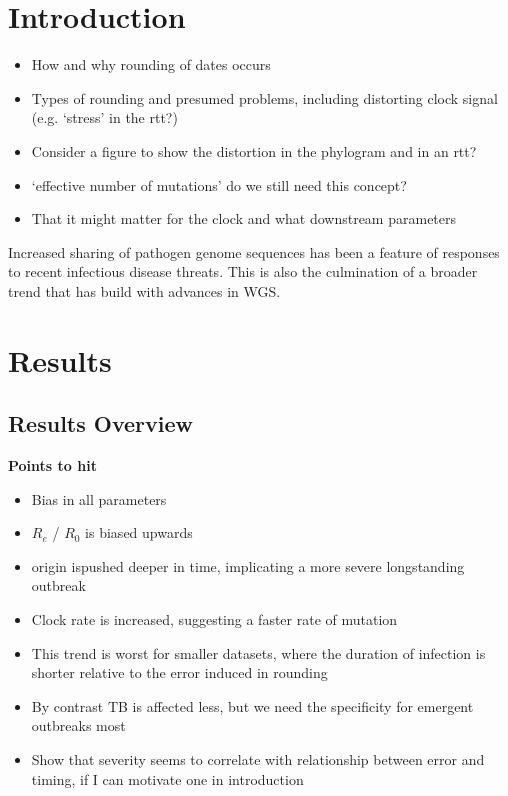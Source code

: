 \documentclass{article}
\begin{document}
\begin{spacing}{1.5}
\section*{Introduction}
\begin{itemize}
    \item How and why rounding of dates occurs
    \item Types of rounding and presumed problems, including distorting clock signal (e.g. `stress' in the rtt?)
    \item Consider a figure to show the distortion in the phylogram and in an rtt?
    \item `effective number of mutations' do we still need this concept?
    \item That it might matter for the clock and what downstream parameters
\end{itemize}

Increased sharing of pathogen genome sequences has been a feature of responses to recent infectious disease threats. This is also the culmination of a broader trend that has build with advances in WGS. 

\section*{Results}
\subsection*{Results Overview}
\textbf{Points to hit}
\begin{itemize}
    \item Bias in all parameters
    \item $R_e$ / $R_0$ is biased upwards
    \item origin ispushed deeper in time, implicating a more severe longstanding outbreak
    \item Clock rate is increased, suggesting a faster rate of mutation
    \item This trend is worst for smaller datasets, where the duration of infection is shorter relative to the error induced in rounding
    \item By contrast TB is affected less, but we need the specificity for emergent outbreaks most
    \item Show that severity seems to correlate with relationship between error and timing, if I can motivate one in introduction
\end{itemize}


\end{spacing}
\end{document}
